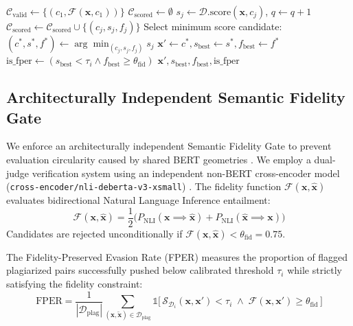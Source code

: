 \documentclass[conference,onecolumn,11pt]{IEEEtran}
\begin{document}
\begin{algorithm}[htbp]
\begin{algorithmic}[1]
        \STATE $\mathcal{C}_{\text{valid}} \leftarrow \{(c_1, \mathcal{F}(\mathbf{x}, c_1))\}$ 
    \ENDIF
    \STATE $\mathcal{C}_{\text{scored}} \leftarrow \emptyset$
         \BREAK \ENDIF
        \STATE $s_j \leftarrow \mathcal{D}.\text{score}(\mathbf{x}, c_j)$, $q \leftarrow q + 1$
        \STATE $\mathcal{C}_{\text{scored}} \leftarrow \mathcal{C}_{\text{scored}} \cup \{(c_j, s_j, f_j)\}$
    \ENDFOR
    \STATE Select minimum score candidate: $(c^*, s^*, f^*) \leftarrow \arg\min_{(c_j, s_j, f_j)} s_j$
        \STATE $\mathbf{x}' \leftarrow c^*, s_{\text{best}} \leftarrow s^*, f_{\text{best}} \leftarrow f^*$
    \ENDIF
        \BREAK {}
    \ENDIF
\ENDWHILE
\STATE $\text{is\_fper} \leftarrow (s_{\text{best}} < \tau_i \land f_{\text{best}} \ge \theta_{\text{fid}})$
\RETURN $\mathbf{x}', s_{\text{best}}, f_{\text{best}}, \text{is\_fper}$
\end{algorithmic}
\end{algorithm}

\subsection{Architecturally Independent Semantic Fidelity Gate}
We enforce an architecturally independent Semantic Fidelity Gate to prevent evaluation circularity caused by shared BERT geometries \cite{zhang2019bertscore}. We employ a dual-judge verification system using an independent non-BERT cross-encoder model (\texttt{cross-encoder/nli-deberta-v3-xsmall}) \cite{he2021deberta}. The fidelity function $\mathcal{F}(\mathbf{x}, \mathbf{\hat{x}})$ evaluates bidirectional Natural Language Inference entailment:
\begin{equation}
    \mathcal{F}(\mathbf{x}, \mathbf{\hat{x}}) = \frac{1}{2}\Big( P_{\text{NLI}}(\mathbf{x} \implies \mathbf{\hat{x}}) + P_{\text{NLI}}(\mathbf{\hat{x}} \implies \mathbf{x}) \Big)
    \label{eq:fidelity}
\end{equation}
Candidates are rejected unconditionally if $\mathcal{F}(\mathbf{x}, \mathbf{\hat{x}}) < \theta_{\text{fid}} = 0.75$.

The Fidelity-Preserved Evasion Rate (FPER) measures the proportion of flagged plagiarized pairs successfully pushed below calibrated threshold $\tau_i$ while strictly satisfying the fidelity constraint:
\begin{equation}
    \text{FPER} = \frac{1}{|\mathcal{D}_{\text{plag}}|} \sum_{(\mathbf{x}, \mathbf{\tilde{x}}) \in \mathcal{D}_{\text{plag}}} \mathbb{1}\big[\, \mathcal{S}_{\mathcal{D}_i}(\mathbf{x}, \mathbf{x}') < \tau_i \;\land\; \mathcal{F}(\mathbf{x}, \mathbf{x}') \ge \theta_{\text{fid}} \,\big]
    \label{eq:fper}
\end{equation}
\end{document}
